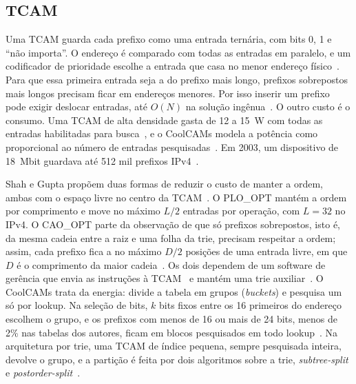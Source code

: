 \documentclass[conference,a4paper]{IEEEtran}
\begin{document}
\subsection{TCAM}
Uma TCAM guarda cada prefixo como uma entrada ternária, com bits 0, 1 e ``não importa''. O endereço é comparado com todas
as entradas em paralelo, e um codificador de prioridade escolhe a entrada que casa no menor endereço
físico~\cite[p.~38, Fig.~1]{shah01}. Para que essa primeira entrada seja a do prefixo mais longo, prefixos sobrepostos mais
longos precisam ficar em endereços menores. Por isso inserir um prefixo pode exigir deslocar entradas, até $O(N)$ na
solução ingênua~\cite[p.~37]{shah01}. O outro custo é o consumo. Uma TCAM de alta densidade gasta de 12 a 15~W com todas as
entradas habilitadas para busca~\cite[\S I]{zane03}, e o CoolCAMs modela a potência como proporcional ao número de entradas
pesquisadas~\cite[\S II]{zane03}. Em 2003, um dispositivo de 18~Mbit guardava até 512 mil prefixos IPv4~\cite[\S II]{zane03}.

Shah e Gupta propõem duas formas de reduzir o custo de manter a ordem, ambas com o espaço livre no centro da
TCAM~\cite[pp.~40--41]{shah01}. O PLO\_OPT mantém a ordem por comprimento e move no máximo $L/2$ entradas por operação,
com $L=32$ no IPv4. O CAO\_OPT parte da observação de que só prefixos sobrepostos, isto é, da mesma cadeia entre a raiz
e uma folha da trie, precisam respeitar a ordem; assim, cada prefixo fica a no máximo $D/2$ posições de uma entrada
livre, em que $D$ é o comprimento da maior cadeia~\cite[pp.~40--43]{shah01}. Os dois dependem de um software de gerência
que envia as instruções à TCAM~\cite[p.~38]{shah01} e mantém uma trie auxiliar~\cite[pp.~40, 43]{shah01}. O CoolCAMs trata da energia:
divide a tabela em grupos (\textit{buckets}) e pesquisa um só por lookup. Na seleção de bits, $k$ bits fixos entre os 16
primeiros do endereço escolhem o grupo, e os prefixos com menos de 16 ou mais de 24 bits, menos de 2\% nas tabelas dos
autores, ficam em blocos pesquisados em todo lookup~\cite[\S III-A]{zane03}. Na arquitetura por trie, uma TCAM de
índice pequena, sempre pesquisada inteira, devolve o grupo, e a partição é feita por dois algoritmos sobre a trie,
\textit{subtree-split} e \textit{postorder-split}~\cite[\S IV, Fig.~5]{zane03}.
\end{document}
